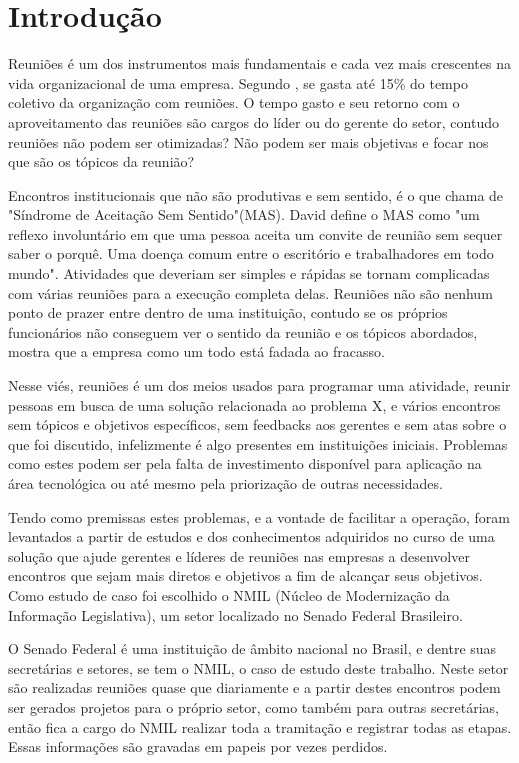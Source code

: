 \chapter[Introdução]{Introdução}
\label{cp:introducao}

Reuniões é um dos instrumentos mais fundamentais e cada vez mais crescentes na vida organizacional de uma empresa. Segundo \cite{allen2016}, se gasta até 15\% do tempo coletivo da organização com reuniões. O tempo gasto e seu retorno com o aproveitamento das reuniões são cargos do líder ou do gerente do setor, contudo reuniões não podem ser otimizadas? Não podem ser mais objetivas e focar nos que são os tópicos da reunião?

Encontros institucionais que não são produtivas e sem sentido, é o que \cite{davidgrady} chama de "Síndrome de Aceitação Sem Sentido"(MAS). David define o MAS como "um reflexo involuntário em que uma pessoa aceita um convite de reunião sem sequer saber o porquê. Uma doença comum entre o escritório e trabalhadores em todo mundo". Atividades que deveriam ser simples e rápidas se tornam complicadas com várias reuniões para a execução completa delas. Reuniões não são nenhum ponto de prazer entre dentro de uma instituição, contudo se os próprios funcionários não conseguem ver o sentido da reunião e os tópicos abordados, mostra que a empresa como um todo está fadada ao fracasso. 

Nesse viés, reuniões é um dos meios usados para programar uma atividade, reunir pessoas em busca de uma solução relacionada ao problema X, e vários encontros sem tópicos e objetivos específicos, sem feedbacks aos gerentes e sem atas sobre o que foi discutido, infelizmente é algo presentes em instituições iniciais. Problemas como estes podem ser pela falta de investimento disponível para aplicação na área tecnológica ou até mesmo pela priorização de outras necessidades.

Tendo como premissas estes problemas, e a vontade de facilitar a operação, foram levantados a partir de estudos e dos conhecimentos adquiridos no curso de \imprimircurso uma solução que ajude gerentes e líderes de reuniões nas empresas a desenvolver encontros que sejam mais diretos e objetivos a fim de alcançar seus objetivos. Como estudo de caso foi escolhido o NMIL (Núcleo de Modernização da Informação Legislativa), um setor localizado no Senado Federal Brasileiro.

O Senado Federal é uma instituição de âmbito nacional no Brasil, e dentre suas secretárias e setores, se tem o NMIL, o caso de estudo deste trabalho. Neste setor são realizadas reuniões quase que diariamente e a partir destes encontros podem ser gerados projetos para o próprio setor, como também para outras secretárias, então fica a cargo do NMIL realizar toda a tramitação e registrar todas as etapas. Essas informações são gravadas em papeis por vezes perdidos.

